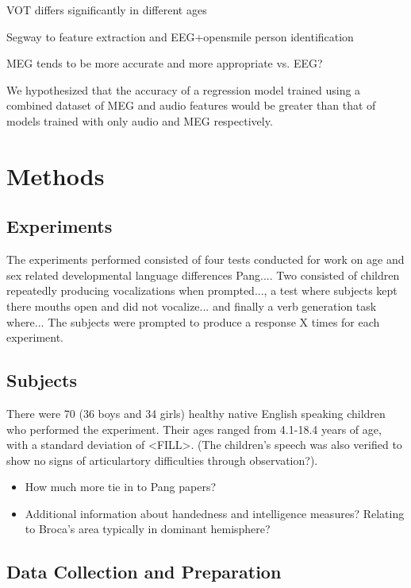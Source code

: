 \documentclass[a4paper]{article}
\begin{document}
VOT differs significantly in different ages

Segway to feature extraction and EEG+opensmile person identification

MEG tends to be more accurate and more appropriate vs. EEG?

We hypothesized that the accuracy of a regression model trained using a combined dataset of MEG and audio features would be greater than that of models trained with only audio and MEG respectively.

\section{Methods}


\subsection{Experiments}

The experiments performed consisted of four tests conducted for work on age and sex related developmental language differences {Pang...}. Two consisted of children repeatedly producing vocalizations when prompted..., a test where subjects kept there mouths open and did not vocalize... and finally a verb generation task where... The subjects were prompted to produce a response X times for each experiment.

\subsection{Subjects}

There were 70 (36 boys and 34 girls) healthy native English speaking children who performed the experiment. Their ages ranged from 4.1-18.4 years of age, with a standard deviation of <FILL>. (The children's speech was also verified to show no signs of articulartory difficulties through observation?).

\begin{itemize}
\item How much more tie in to Pang papers?
\item Additional information about handedness and intelligence measures? Relating to Broca's area typically in dominant hemisphere?
\end{itemize}

\subsection{Data Collection and Preparation}
\end{document}
